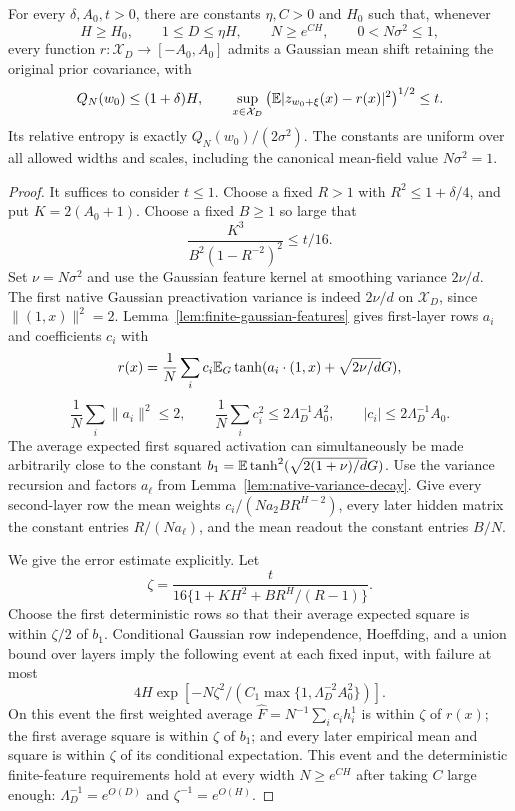 \begin{theorem}
\label{thm:native-near-baseline}
For every $\delta,A_0,t>0$, there are constants $\eta,C>0$ and $H_0$ such that, whenever
\[
 H\ge H_0,\qquad 1\le D\le\eta H,\qquad
 N\ge e^{CH},\qquad 0<N\sigma^2\le1,
\]
every function $r:\mathcal X_D\to[-A_0,A_0]$ admits a Gaussian mean shift retaining the original prior covariance, with
\[
 Q_N(w_0)\le(1+\delta)H,
 \qquad
 \sup_{x\in\mathcal X_D}\left(\mathbb E|z_{w_0+\xi}(x)-r(x)|^2\right)^{1/2}\le t.
\]
Its relative entropy is exactly $Q_N(w_0)/(2\sigma^2)$. The constants are uniform over all allowed widths and scales, including the canonical mean-field value $N\sigma^2=1$.
\end{theorem}
\begin{proof}
It suffices to consider $t\le1$. Choose a fixed $R>1$ with $R^2\le1+\delta/4$, and put $K=2(A_0+1)$. Choose a fixed $B\ge1$ so large that
\[
 \frac{K^3}{B^2(1-R^{-2})^2}\le t/16.
\]
Set $\nu=N\sigma^2$ and use the Gaussian feature kernel at smoothing variance $2\nu/d$. The first native Gaussian preactivation variance is indeed $2\nu/d$ on $\mathcal X_D$, since $\|(1,x)\|^2=2$. Lemma~\ref{lem:finite-gaussian-features} gives first-layer rows $a_i$ and coefficients $c_i$ with
\[
 r(x)=\frac1N\sum_i c_i\mathbb E_G\tanh(a_i\cdot(1,x)+\sqrt{2\nu/d}G),
\]
\[
 \frac1N\sum_i\|a_i\|^2\le2,\qquad
 \frac1N\sum_i c_i^2\le2\Lambda_D^{-1}A_0^2,
 \qquad |c_i|\le2\Lambda_D^{-1}A_0.
\]
The average expected first squared activation can simultaneously be made arbitrarily close to the constant
$b_1=\mathbb E\tanh^2(\sqrt{2(1+\nu)/d}G)$.
Use the variance recursion and factors $a_\ell$ from Lemma~\ref{lem:native-variance-decay}.
Give every second-layer row the mean weights
$c_i/(Na_2BR^{H-2})$, every later hidden matrix the constant entries $R/(Na_\ell)$, and the mean readout the constant entries $B/N$.

We give the error estimate explicitly. Let
\[
 \zeta=\frac{t}{16\{1+KH^2+BR^H/(R-1)\}}.
\]
Choose the first deterministic rows so that their average expected square is within $\zeta/2$ of $b_1$. Conditional Gaussian row independence, Hoeffding, and a union bound over layers imply the following event at each fixed input, with failure at most
\[
 4H\exp[-N\zeta^2/(C_1\max\{1,\Lambda_D^{-2}A_0^2\})].
\]
On this event the first weighted average $\widehat F=N^{-1}\sum_i c_i h_i^1$ is within $\zeta$ of $r(x)$; the first average square is within $\zeta$ of $b_1$; and every later empirical mean and square is within $\zeta$ of its conditional expectation. This event and the deterministic finite-feature requirements hold at every width $N\ge e^{CH}$ after taking $C$ large enough: $\Lambda_D^{-1}=e^{O(D)}$ and $\zeta^{-1}=e^{O(H)}$.


\end{proof}
